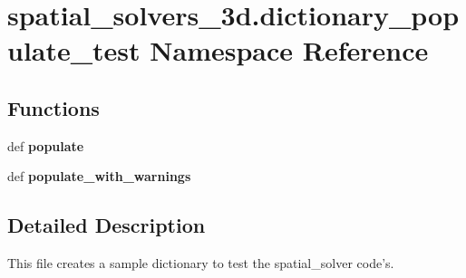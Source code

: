 \hypertarget{namespacespatial__solvers__3d_1_1dictionary__populate__test}{\section{spatial\-\_\-solvers\-\_\-3d.\-dictionary\-\_\-populate\-\_\-test Namespace Reference}
\label{namespacespatial__solvers__3d_1_1dictionary__populate__test}
}
\subsection*{Functions}
\begin{DoxyCompactItemize}
\item 
\hypertarget{namespacespatial__solvers__3d_1_1dictionary__populate__test_a872f88445af5d0a77c04197deafd8867}{def {\bfseries populate}}\label{namespacespatial__solvers__3d_1_1dictionary__populate__test_a872f88445af5d0a77c04197deafd8867}

\item 
\hypertarget{namespacespatial__solvers__3d_1_1dictionary__populate__test_a13310225824b294394bf44daf491412e}{def {\bfseries populate\-\_\-with\-\_\-warnings}}\label{namespacespatial__solvers__3d_1_1dictionary__populate__test_a13310225824b294394bf44daf491412e}

\end{DoxyCompactItemize}


\subsection{Detailed Description}
\begin{DoxyVerb}This file creates a sample dictionary to test the spatial_solver code's.\end{DoxyVerb}
 